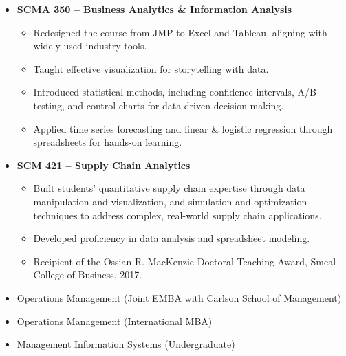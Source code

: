 \documentclass[a4paper, 10pt]{article}
\begin{document}
{\begin{itemize}
  \item \textbf{SCMA 350 – Business Analytics \& Information Analysis}
    \begin{itemize}
      \item Redesigned the course from JMP to Excel and Tableau, aligning with widely used industry tools.
      \item Taught effective visualization for storytelling with data.
      \item Introduced statistical methods, including confidence intervals, A/B testing, and control charts for data-driven decision-making.
      \item Applied time series forecasting and linear \& logistic regression through spreadsheets for hands-on learning.
    \end{itemize}

\end{itemize}

\begin{itemize}
  \item \textbf{SCM 421 – Supply Chain Analytics}
    \begin{itemize}
      \item Built students’ quantitative supply chain expertise through data manipulation and visualization, and simulation and optimization techniques to address complex, real-world supply chain applications.
      \item Developed proficiency in data analysis and spreadsheet modeling.
      \item Recipient of the Ossian R. MacKenzie Doctoral Teaching Award, Smeal College of Business, 2017.
    \end{itemize}
\end{itemize}

\begin{itemize}
  \item Operations Management (Joint EMBA with Carlson School of Management)
  \item Operations Management (International MBA)
  \item Management Information Systems (Undergraduate)
\end{itemize}
}
\end{document}
